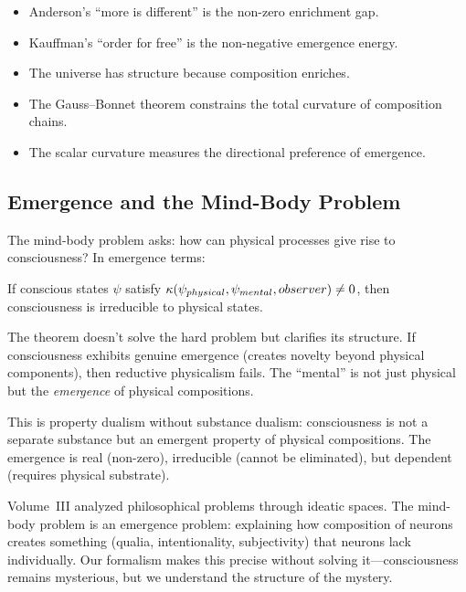 \begin{itemize}
  \item Anderson's ``more is different'' is the non-zero enrichment gap.
  \item Kauffman's ``order for free'' is the non-negative emergence energy.
  \item The universe has structure because composition enriches.
  \item The Gauss--Bonnet theorem constrains the total curvature of composition
    chains.
  \item The scalar curvature measures the directional preference of emergence.
\end{itemize}


\subsection{Emergence and the Mind-Body Problem}

The mind-body problem asks: how can physical processes give rise to consciousness?
In emergence terms:

\begin{theorem}
\label{thm:mind-body}
If conscious states $\psi$ satisfy $\kappa(\psi_{physical}, \psi_{mental}, observer) \neq 0$,
then consciousness is irreducible to physical states.
\end{theorem}

\begin{interpretation}
The theorem doesn't solve the hard problem but clarifies its structure. If
consciousness exhibits genuine emergence (creates novelty beyond physical
components), then reductive physicalism fails. The ``mental'' is not just
physical but the \emph{emergence} of physical compositions.

This is property dualism without substance dualism: consciousness is not a
separate substance but an emergent property of physical compositions. The
emergence is real (non-zero), irreducible (cannot be eliminated), but dependent
(requires physical substrate).

Volume~III analyzed philosophical problems through ideatic spaces. The mind-body
problem is an emergence problem: explaining how composition of neurons creates
something (qualia, intentionality, subjectivity) that neurons lack individually.
Our formalism makes this precise without solving it---consciousness remains
mysterious, but we understand the structure of the mystery.
\end{interpretation}

